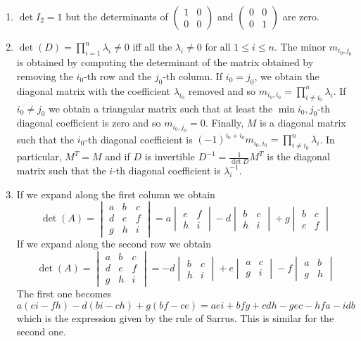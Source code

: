 \begin{enumerate}
\item $\det{I_2} = 1$ but
  the determinants of
  $\begin{pmatrix} 1 & 0 \\ 0 & 0 \end{pmatrix}$ and
  $\begin{pmatrix} 0 & 0 \\ 0 & 1 \end{pmatrix}$ are zero.
\item $\det{(D)} = \prod_{i=1}^n \lambda_i \neq 0$ iff all the
  $\lambda_i \neq 0$ for all $1 \leq i \leq n$.
  The minor $m_{i_0,j_0}$ is obtained by computing the determinant of the matrix
  obtained by removing the $i_0$-th row and the $j_0$-th column. If $i_0 = j_0$,
  we obtain the diagonal matrix with the coefficient $\lambda_{i_0}$ removed
  and so $m_{i_0,i_0} = \prod_{i \neq i_0}^n \lambda_i$.
  If $i_0 \neq j_0$ we obtain a triangular matrix such that at least the
  $\min{i_0,j_0}$-th diagonal coefficient is zero and so
  $m_{i_0,j_0} = 0$. Finally, $M$ is a diagonal matrix
  such that the $i_0$-th diagonal coefficient is
  ${(-1)}^{i_0+i_0} m_{i_0,i_0} = \prod_{i \neq i_0}^n \lambda_i$.
  In particular, $M^T = M$ and if $D$ is invertible
  $D^{-1} = \frac{1}{\det{D}} M^T$ is the diagonal matrix such that
  the $i$-th diagonal coefficient is $\lambda_i^{-1}$.
\item If we expand along the first column we obtain
  $$\det{(A)} =
  \begin{vmatrix} a & b & c \\ d & e & f \\ g & h & i \end{vmatrix} =
  {a \begin{vmatrix} e & f \\ h & i \end{vmatrix}}
  - {d \begin{vmatrix} b & c \\ h & i \end{vmatrix}}
  + {g \begin{vmatrix} b & c \\ e & f \end{vmatrix}}$$
  If we expand along the second row we obtain
  $$\det{(A)} =
  \begin{vmatrix} a & b & c \\ d & e & f \\ g & h & i \end{vmatrix} =
  - {d \begin{vmatrix} b & c \\ h & i \end{vmatrix}}
  + {e \begin{vmatrix} a & c \\ g & i \end{vmatrix}}
  - {f \begin{vmatrix} a & b \\ g & h \end{vmatrix}}$$
  The first one becomes
  $a{(ei - fh)} - d{(bi - ch)} + g{(bf - ce)}=
  aei + bfg + cdh - gec - hfa - idb$ which is the expression given by
  the rule of Sarrus. This is similar for the second one.


\end{enumerate}
